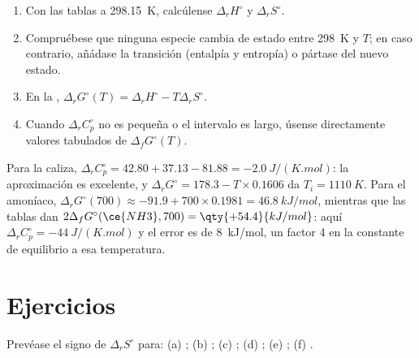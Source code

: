\begin{method}\label{met:b2:reaction-free-energy:delta-g-standard}
\begin{enumerate}
  \item Con las tablas a \qty{298.15}{K}, calcúlense $\Delta_r H^\circ$ y
        $\Delta_r S^\circ$.
  \item Compruébese que ninguna especie cambia de estado entre \qty{298}{K} y $T$;
        en caso contrario, añádase la transición (entalpía y entropía) o pártase
        del nuevo estado.
  \item En la , $\Delta_r G^\circ(T) = \Delta_r H^\circ
        - T\Delta_r S^\circ$.
  \item Cuando $\Delta_r C^\circ_p$ no es pequeña o el intervalo es largo,
        úsense directamente valores tabulados de $\Delta_f G^\circ(T)$.
\end{enumerate}
\end{method}

\begin{example}\label{ex:b2:reaction-free-energy:tests}
Para la caliza, $\Delta_r C^\circ_p = 42.80 + 37.13 - 81.88 =
\qty{-2.0}{J/(K.mol)}$: la aproximación es excelente, y $\Delta_r
G^\circ = 178.3 - T \times 0.1606$ da $T_i = \qty{1110}{K}$. Para el amoníaco,
$\Delta_r G^\circ(700) \approx -91.9 + 700 \times 0.1981 =
\qty{+46.8}{kJ/mol}$, mientras que las tablas dan $2\Delta_f G^\circ(\ce{NH3}, 700) =
\qty{+54.4}{kJ/mol}$: aquí $\Delta_r C^\circ_p = \qty{-44}{J/(K.mol)}$ y
el error es de \qty{8}{kJ/mol}, un factor 4 en la constante de equilibrio a
esa temperatura.
\end{example}

\section{Ejercicios}

\begin{exercise}[$\star$]\label{exo:b2:reaction-free-energy:1}
Prevéase el signo de $\Delta_r S^\circ$ para: (a) ;
(b) ; (c) ;
(d) ; (e) ;
(f) .
\end{exercise}

